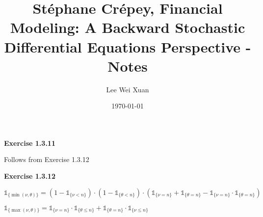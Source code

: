 \documentclass[12pt]{article}
\title{Stéphane Crépey, Financial Modeling: A Backward Stochastic 
Differential Equations Perspective - Notes}
\author{Lee Wei Xuan}
\date{\today}
\begin{document}
\maketitle

\textbf{Exercise 1.3.11}

Follows from Exercise 1.3.12



\textbf{Exercise 1.3.12}

$\mathds{1}_{\{\min(\nu, \theta)\}} = (1 - \mathds{1}_{\{\nu < n\}}) \cdot (1 - \mathds{1}_{\{\theta < n\}}) \cdot (\mathds{1}_{\{\nu = n\}} + \mathds{1}_{\{\theta = n\}} - \mathds{1}_{\{\nu = n\}} \cdot \mathds{1}_{\{\theta = n\}})$

$\mathds{1}_{\{\max(\nu, \theta)\}} = \mathds{1}_{\{\nu = n\}}\cdot \mathds{1}_{\{\theta \leq n\}} + \mathds{1}_{\{\theta = n\}}\cdot \mathds{1}_{\{\nu \leq n\}}$
\end{document}
